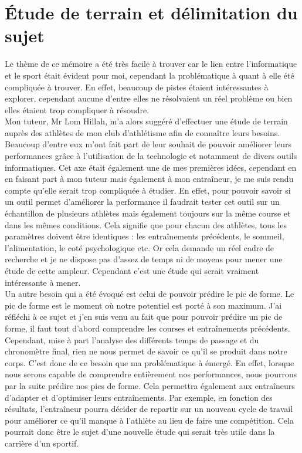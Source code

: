 \chapter*{Étude de terrain et délimitation du sujet}
\label{chap:etude_terrain}



Le thème de ce mémoire a été très facile à trouver car le lien entre l'informatique et le sport était évident pour moi, cependant la problématique à quant à elle été compliquée à trouver. En effet, beaucoup de pistes étaient intéressantes à explorer, cependant aucune d'entre elles ne résolvaient un réel problème ou bien elles étaient trop compliquer à résoudre.\\

Mon tuteur, Mr Lom Hillah, m'a alors suggéré d'effectuer une étude de terrain auprès des athlètes de mon club d'athlétisme afin de connaître leurs besoins. 
Beaucoup d'entre eux m'ont fait part de leur souhait de pouvoir améliorer leurs performances grâce à l'utilisation de la technologie et notamment de divers outils informatiques. Cet axe était également une de mes premières idées, cependant en en faisant part à mon tuteur mais également à mon entraîneur, je me suis rendu compte qu'elle serait trop compliquée à étudier. En effet, pour pouvoir savoir si un outil permet d'améliorer la performance il faudrait tester cet outil sur un échantillon de plusieurs athlètes mais également toujours sur la même course et dans les mêmes conditions. Cela signifie que pour chacun des athlètes, tous les paramètres doivent être identiques : les entraînements précédents, le sommeil, l'alimentation, le coté psychologique etc. Or cela demande un réel cadre de recherche et je ne dispose pas d'assez de temps ni de moyens pour mener une étude de cette ampleur. Cependant c'est une étude qui serait vraiment intéressante à mener.\\

Un autre besoin qui a été évoqué est celui de pouvoir prédire le pic de forme. Le pic de forme est le moment où notre potentiel est porté à son maximum. J'ai réfléchi à ce sujet et j'en suis venu au fait que pour pouvoir prédire un pic de forme, il faut tout d'abord comprendre les courses et entraînements précédents. Cependant, mise à part l'analyse des différents temps de passage et du chronomètre final, rien ne nous permet de savoir ce qu'il se produit dans notre corps. C'est donc de ce besoin que ma problématique à émergé. En effet, lorsque nous serons capable de comprendre entièrement nos performances, nous pourrons par la suite prédire nos pics de forme. Cela permettra également aux entraîneurs d'adapter et d'optimiser leurs entraînements. Par exemple, en fonction des résultats, l'entraîneur pourra décider de repartir sur un nouveau cycle de travail pour améliorer ce qu'il manque à l'athlète au lieu de faire une compétition.
Cela pourrait donc être le sujet d'une nouvelle étude qui serait très utile dans la carrière d'un sportif. 


        
